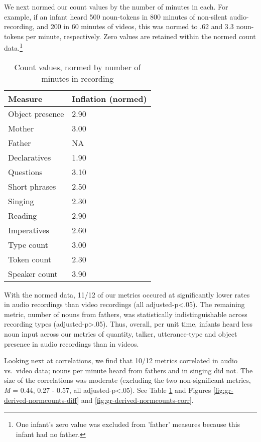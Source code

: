 \documentclass[floatsintext,man]{apa6}
\theoremstyle{definition}
\theoremstyle{definition}
\theoremstyle{definition}
\theoremstyle{remark}
\begin{document}
We next normed our count values by the number of minutes in each. For
example, if an infant heard 500 noun-tokens in 800 minutes of non-silent
audio-recording, and 200 in 60 minutes of videos, this was normed to .62
and 3.3 noun-tokens per minute, respectively. Zero values are retained
within the normed count
data.\footnote{One infant's zero value was excluded from 'father' measures because this infant had no father.}

\begin{table}[tbp]
\begin{center}
\begin{threeparttable}
\caption{\label{tab:normtable}Count values, normed by number of minutes in recording}
\small{
\begin{tabular}{ll}
\toprule
Measure & \multicolumn{1}{c}{Inflation (normed)}\\
\midrule
Object presence & 2.90\\
Mother & 3.00\\
Father & NA\\
Declaratives & 1.90\\
Questions & 3.10\\
Short phrases & 2.50\\
Singing & 2.30\\
Reading & 2.90\\
Imperatives & 2.60\\
Type count & 3.00\\
Token count & 2.30\\
Speaker count & 3.90\\
\bottomrule
\end{tabular}
}
\end{threeparttable}
\end{center}
\end{table}

With the normed data, 11/12 of our metrics occured at significantly
lower rates in audio recordings than video recordings (all
adjusted-p\textless{}.05). The remaining metric, number of nouns from
fathers, was statistically indistinguishable across recording types
(adjusted-p\textgreater{}.05). Thus, overall, per unit time, infants
heard less noun input across our metrics of quantity, talker,
utterance-type and object presence in audio recordings than in videos.

Looking next at correlations, we find that 10/12 metrics correlated in
audio vs.~video data; nouns per minute heard from fathers and in singing
did not. The size of the correlations was moderate (excluding the two
non-significant metrics, \emph{M} = 0.44, 0.27 - 0.57, all
adjusted-p\textless{}.05). See Table \ref{tab:normtable} and Figures
\ref{fig:gr-derived-normcounts-diff} and
\ref{fig:gr-derived-normcounts-corr}.
\end{document}
